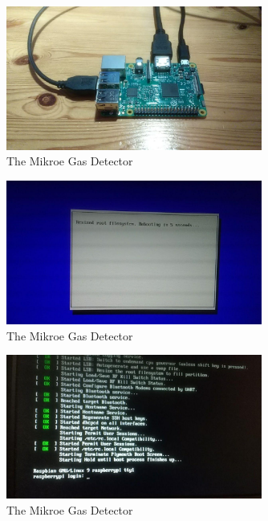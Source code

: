 \documentclass[11pt]{report}
\begin{document}
		\begin{figure}[ht]
			\centering
			\includegraphics[width=0.75\textwidth]{images/pi/install_cables.jpg} 
			\caption{The Mikroe Gas Detector}
		\end{figure}

		\begin{figure}[ht]
			\centering
			\includegraphics[width=0.75\textwidth]{images/pi/install_first_boot.jpg} 
			\caption{The Mikroe Gas Detector}
		\end{figure}

		\begin{figure}[ht]
			\centering
			\includegraphics[width=0.75\textwidth]{images/pi/first_login.jpg} 
			\caption{The Mikroe Gas Detector}
		\end{figure}
\end{document}
